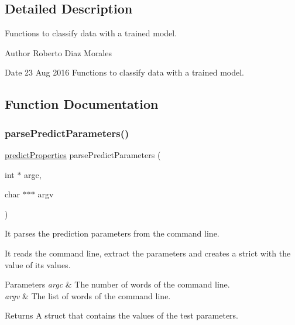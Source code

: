 \subsection{Detailed Description}
Functions to classify data with a trained model. 

\begin{DoxyAuthor}{Author}
Roberto Diaz Morales 
\end{DoxyAuthor}
\begin{DoxyDate}{Date}
23 Aug 2016 Functions to classify data with a trained model. 
\end{DoxyDate}


\subsection{Function Documentation}
\hypertarget{LIBIRWLS-predict_8h_a186e63263bf147110137e90adafcb8c7}{}\label{LIBIRWLS-predict_8h_a186e63263bf147110137e90adafcb8c7} 
\subsubsection{\texorpdfstring{parse\+Predict\+Parameters()}{parsePredictParameters()}}
{\ttfamily \hyperlink{structpredictProperties}{predict\+Properties} parse\+Predict\+Parameters (\begin{DoxyParamCaption}\item[{int $\ast$}]{argc,  }\item[{char $\ast$$\ast$$\ast$}]{argv }\end{DoxyParamCaption})}



It parses the prediction parameters from the command line. 

It reads the command line, extract the parameters and creates a strict with the value of its values. 
\begin{DoxyParams}{Parameters}
{\em argc} & The number of words of the command line. \\
\hline
{\em argv} & The list of words of the command line. \\
\hline
\end{DoxyParams}
\begin{DoxyReturn}{Returns}
A struct that contains the values of the test parameters. 
\end{DoxyReturn}
\hypertarget{LIBIRWLS-predict_8h_a53efcb64ca8e76d4a2cb65991189af91}{}\label{LIBIRWLS-predict_8h_a53efcb64ca8e76d4a2cb65991189af91} 
